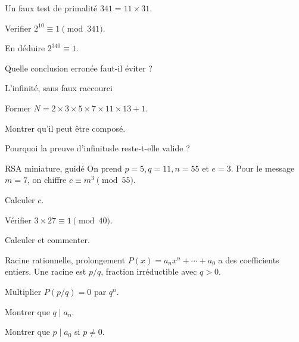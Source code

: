 \begingroup\renewcommand{\otBesoinPlace}[1]{}\begin{minipage}{\linewidth}
\begin{exercice}[3]{Un faux test de primalité}
$341=11\times31$.
\begin{questions}
\item Verifier $2^{10}\equiv1\pmod{341}$.
\item En déduire $2^{340}\equiv1$.
\item Quelle conclusion erronée faut-il éviter ?
\end{questions}
\end{exercice}
\begin{exercice}[3]{L’infinité, sans faux raccourci}

\begin{questions}
\item Former $N=2\times3\times5\times7\times11\times13+1$.
\item Montrer qu’il peut être composé.
\item Pourquoi la preuve d’infinitude reste-t-elle valide ?
\end{questions}
\end{exercice}
\begin{exercice}[3]{RSA miniature, guidé}
On prend $p=5,q=11,n=55$ et $e=3$. Pour le message $m=7$, on chiffre $c\equiv m^3\pmod{55}$.
\begin{questions}
\item Calculer $c$.
\item Vérifier $3\times27\equiv1\pmod{40}$.
\item Calculer  et commenter.
\end{questions}
\end{exercice}
\begin{exercice}[3]{Racine rationnelle, prolongement}
$P(x)=a_nx^n+\cdots+a_0$ a des coefficients entiers. Une racine est $p/q$, fraction irréductible avec $q>0$.
\begin{questions}
\item Multiplier $P(p/q)=0$ par $q^n$.
\item Montrer que $q\mid a_n$.
\item Montrer que $p\mid a_0$ si $p\ne0$.
\end{questions}
\end{exercice}
\end{minipage}\endgroup
